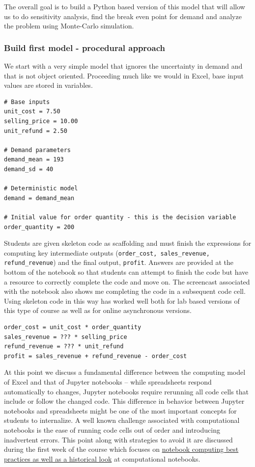 \documentclass[ited,blindrev]{informs3}              %
\newcommand{\code}[1]{\texttt{#1}}
\begin{document}
The overall goal is to build a Python based version of this model that will allow us to do sensitivity analysis, find the break even point for demand and analyze the problem using Monte-Carlo simulation.

\subsubsection{Build first model - procedural approach}
 
We start with a very simple model that ignores the uncertainty in demand and that is not object oriented. Proceeding much like we would in Excel, base input values are stored in variables. 

\begin{tcolorbox}
\begin{verbatim}
# Base inputs
unit_cost = 7.50
selling_price = 10.00
unit_refund = 2.50

# Demand parameters
demand_mean = 193
demand_sd = 40

# Deterministic model
demand = demand_mean

# Initial value for order quantity - this is the decision variable
order_quantity = 200
\end{verbatim}
\end{tcolorbox}

Students are given skeleton code as scaffolding and must finish the expressions for computing key intermediate outputs (\code{order\_cost, sales\_revenue, refund\_revenue}) and the final output, \code{profit}. Answers are provided at the bottom of the notebook so that students can attempt to finish the code but have a resource to correctly complete the code and move on. The screencast associated with the notebook also shows me completing the code in a subsequent code cell. Using skeleton code in this way has worked well both for lab based versions of this type of course as well as for online asynchronous versions.

\begin{tcolorbox}
\begin{verbatim}
order_cost = unit_cost * order_quantity
sales_revenue = ??? * selling_price
refund_revenue = ??? * unit_refund
profit = sales_revenue + refund_revenue - order_cost
\end{verbatim}
\end{tcolorbox}

At this point we discuss a fundamental difference between the computing model of Excel and that of Jupyter notebooks -- while spreadsheets respond automatically to changes, Jupyter notebooks require rerunning all code cells that include or follow the changed code. This difference in behavior between Jupyter notebooks and spreadsheets might be one of the most important concepts for students to internalize. A well known challenge associated with computational notebooks is the ease of running code cells out of order and introducing inadvertent errors. This point along with strategies to avoid it are discussed during the first week of the course which focuses on \href{http://www.sba.oakland.edu/faculty/isken/courses/mis6900/jupyter_notebooks.html}{notebook computing best practices as well as a historical look} at computational notebooks.
\end{document}

